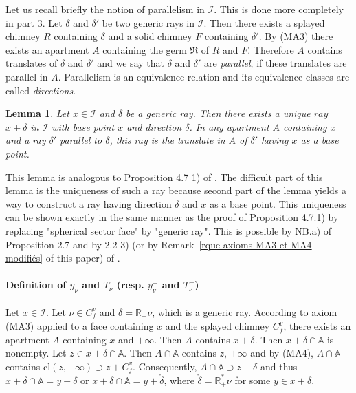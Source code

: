 \documentclass[12pt]{article}
\theoremstyle{plain}
\newtheorem{lemme}[thm]{Lemma}
\theoremstyle{definition}
\newcommand{\R}{\mathbb{R}}
\newcommand{\A}{\mathbb{A}}
\newcommand{\I}{\mathcal{I}}
\begin{document}
\vspace{3mm}
Let us recall briefly the notion of parallelism in $\I$. This is done more completely in \cite{rousseau2011masures} part 3. Let $\delta$ and $\delta'$ be two generic rays in $\I$. Then there exists a splayed chimney $R$ containing $\delta$ and a solid chimney $F$ containing $\delta'$. By (MA3) there exists an apartment $A$ containing the germ $\mathfrak{R}$ of $R$ and $F$. Therefore $A$ contains translates of $\delta$ and $\delta'$ and we say that $\delta$ and $\delta'$ are \textit{parallel}, if these translates are parallel in $A$. Parallelism is an equivalence relation and its equivalence classes are called \textit{directions}.

\begin{lemme}\label{lemme demi-droite de base donnée}
Let $x\in \I$ and $\delta$ be a generic ray. Then there exists a unique $ray$ $x+\delta$ in $\I$ with base point $x$ and direction $\delta$. In any apartment $A$ containing $x$ and a ray $\delta'$ parallel to $\delta$, this ray is the translate in $A$ of $\delta'$ having $x$ as a base point.
\end{lemme}

This lemma is analogous to Proposition 4.7 1) of \cite{rousseau2011masures}. The difficult part of this lemma is the uniqueness of such a ray because second part of the lemma yields a way to construct a ray having direction $\delta$ and $x$ as a base point. This uniqueness can be shown exactly in the same manner as the proof of Proposition 4.7.1) by replacing "spherical sector face" by "generic ray". This is possible by NB.a) of Proposition 2.7 and by 2.2 3) (or by Remark~\ref{rque axioms MA3 et MA4 modifiés} of this paper) of \cite{rousseau2011masures}.


\paragraph{Definition of $y_\nu$ and $T_\nu$ (resp. $y^-_\nu$ and $T^-_\nu$)}
Let $x\in \mathcal{I}$. Let $\nu \in C_f^v$ and $\delta=\R_+\nu$, which is a generic ray. According to axiom (MA3) applied to a face containing $x$ and the splayed chimney $C^v_f$, there exists an apartment $A$ containing $x$ and $+\infty$. Then $A$ contains $x+\delta$. Then $x+\delta\cap \A$ is nonempty. Let $z\in x+\delta\cap \A$. Then $A\cap \A$ contains $z$, $+\infty$ and by (MA4), $A\cap\A$ contains $\mathrm{cl}(z,+\infty)\supset z+\overline{C_f^v}$. Consequently, $A\cap\A \supset z+\delta$ and thus $x+\delta\cap \A=y+\delta$ or $x+\delta\cap \A=y+\mathring{\delta}$, where $\mathring \delta=\R^*_+\nu$ for some $y\in x+\delta$.
\end{document}
